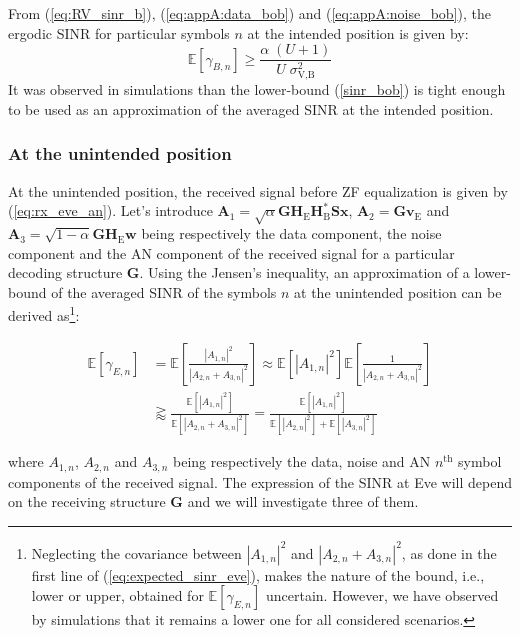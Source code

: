 \documentclass[journal,comsoc]{IEEEtran}
\newcommand{\EX}[1]{\mathbb{E} \left[#1\right]}%
\newcommand{\HE}{\textbf{H}_{\text{E}}}
\newcommand{\HB}{\textbf{H}_{\text{B}}}
\newcommand{\spread}{\textbf{S}}
\newcommand{\w}{\textbf{w}}
\begin{document}
From (\ref{eq:RV_sinr_b}), (\ref{eq:appA:data_bob}) and (\ref{eq:appA:noise_bob}), the ergodic SINR for particular symbols $n$ at the intended position is given by:
\begin{equation}
\EX{\gamma_{B,n}} \geq \frac{\alpha \;(U+1)}{U \; \sigma_{\text{V,B}}^2}
\label{sinr_bob}
\end{equation}
It was observed in simulations than the lower-bound (\ref{sinr_bob}) is tight enough to be used as an approximation of the averaged SINR at the intended position. 


\subsubsection{At the unintended position}
At the unintended position, the received signal before ZF equalization is given by (\ref{eq:rx_eve_an}). Let's introduce $\textbf{A}_1 = \sqrt{\alpha}  \textbf{G} \HE \HB^* \spread\textbf{x} $, $\textbf{A}_2 = \textbf{G}  \textbf{v}_\text{E}$ and $\textbf{A}_3 = \sqrt{1-\alpha} \textbf{G} \HE \w$ being respectively the data component, the noise component and the AN component of the received signal for a particular decoding structure $\textbf{G}$. Using the Jensen's inequality, an approximation of a lower-bound of the averaged SINR of the symbols $n$ at the unintended position can be derived as\footnote{Neglecting the covariance between $\left|A_{1,n}\right|^2$ and $\left| A_{2,n} + A_{3,n}\right|^2$, as  done in the first line of (\ref{eq:expected_sinr_eve}), makes the nature of the bound, i.e., lower or upper, obtained for $\EX{\gamma_{E,n}}$ uncertain. However, we have observed by simulations that it remains a lower one for all considered scenarios.}:

\begin{equation}
\begin{split}
\EX{\gamma_{E,n}} &= \EX{  \frac{ \left| A_{1,n} \right|^2  }{ \left| A_{2,n} + A_{3,n} \right|^2 } }  \approx  \EX{ \left| A_{1,n} \right|^2 }  \EX{ \frac{1}{ \left| A_{2,n} + A_{3,n} \right|^2} }  \\
& \gtrapprox \frac{\EX{   \left| A_{1,n} \right|^2  } }{\EX{ \left| A_{2,n} + A_{3,n} \right|^2  }} =  \frac{\EX{  \left| A_{1,n}\right|^2  } }{\EX{  \left| A_{2,n} \right|^2  } +  \EX{  \left|A_{3,n}\right|^2  }}
\label{eq:expected_sinr_eve}
\end{split}
\end{equation}

where $A_{1,n}$, $A_{2,n}$ and $A_{3,n}$ being respectively the data, noise and AN $n^{\text{th}}$ symbol components of the received signal. The expression of the SINR at Eve will depend on the receiving structure $\textbf{G}$ and we will investigate three of them.
\end{document}
